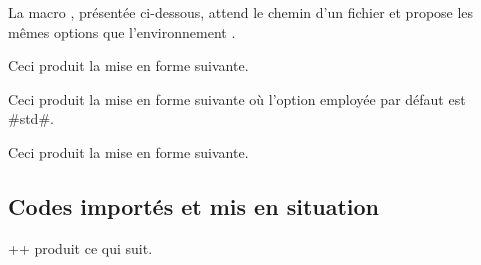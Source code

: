 \medskip


La macro , présentée ci-dessous, attend le chemin d'un fichier et propose les mêmes options que l'environnement .


\begin{tdocexa}
    \leavevmode

    \begin{tdoclatex}[code]

    \end{tdoclatex}

    Ceci produit la mise en forme suivante.


\end{tdocexa}


\begin{tdocexa}[À la suite]
    \leavevmode

    \begin{tdoclatex}[code]

    \end{tdoclatex}

    Ceci produit la mise en forme suivante où l'option employée par défaut est \tdoclatexin#std#.


\end{tdocexa}


\begin{tdocexa}
    \leavevmode

    \begin{tdoclatex}[code]

    \end{tdoclatex}

    Ceci produit la mise en forme suivante.


\end{tdocexa}



\subsection{Codes importés et mis en situation}
\label{tutodoc-latexshow}

\begin{tdocexa}
    \tdoclatexin++ produit ce qui suit.

    \medskip

    \begin{tdocshowcaseDOC}

    \end{tdocshowcaseDOC}
\end{tdocexa}


